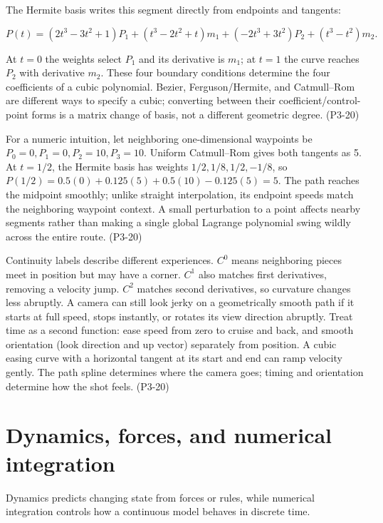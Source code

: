 The Hermite basis writes this segment directly from endpoints and tangents:

\[
P(t)=(2t^3-3t^2+1)P_1+(t^3-2t^2+t)m_1+(-2t^3+3t^2)P_2+(t^3-t^2)m_2.
\]

At \(t=0\) the weights select \(P_1\) and its derivative is \(m_1\); at \(t=1\) the curve reaches \(P_2\) with derivative \(m_2\). These four boundary conditions determine the four coefficients of a cubic polynomial. Bezier, Ferguson/Hermite, and Catmull--Rom are different ways to specify a cubic; converting between their coefficient/control-point forms is a matrix change of basis, not a different geometric degree. (P3-20)

For a numeric intuition, let neighboring one-dimensional waypoints be \(P_0=0,P_1=0,P_2=10,P_3=10\). Uniform Catmull--Rom gives both tangents as 5. At \(t=1/2\), the Hermite basis has weights \(1/2,1/8,1/2,-1/8\), so \(P(1/2)=0.5(0)+0.125(5)+0.5(10)-0.125(5)=5\). The path reaches the midpoint smoothly; unlike straight interpolation, its endpoint speeds match the neighboring waypoint context. A small perturbation to a point affects nearby segments rather than making a single global Lagrange polynomial swing wildly across the entire route. (P3-20)

Continuity labels describe different experiences. \(C^0\) means neighboring pieces meet in position but may have a corner. \(C^1\) also matches first derivatives, removing a velocity jump. \(C^2\) matches second derivatives, so curvature changes less abruptly. A camera can still look jerky on a geometrically smooth path if it starts at full speed, stops instantly, or rotates its view direction abruptly. Treat time as a second function: ease speed from zero to cruise and back, and smooth orientation (look direction and up vector) separately from position. A cubic easing curve with a horizontal tangent at its start and end can ramp velocity gently. The path spline determines where the camera goes; timing and orientation determine how the shot feels. (P3-20)

\section{Dynamics, forces, and numerical integration}\label{04-visual-computing-ii-ch029-dynamics-forces-and-numerical-integration}

\hypertarget{04-visual-computing-ii-ch029-dynamics-forces-and-numerical-integration}{}

Dynamics predicts changing state from forces or rules, while numerical integration controls how a continuous model behaves in discrete time.


